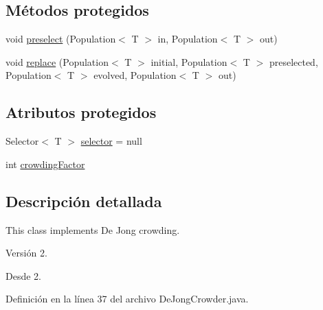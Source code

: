 \subsection*{Métodos protegidos}
\begin{DoxyCompactItemize}
\item 
void \hyperlink{classjenes_1_1stage_1_1operator_1_1common_1_1_de_jong_crowder_3_01_t_01extends_01_chromosome_01_4_a98f463e26bf3fd0fd703320007302594}{preselect} (Population$<$ T $>$ in, Population$<$ T $>$ out)
\item 
void \hyperlink{classjenes_1_1stage_1_1operator_1_1common_1_1_de_jong_crowder_3_01_t_01extends_01_chromosome_01_4_a7d659276ad2103199080458c85acf59e}{replace} (Population$<$ T $>$ initial, Population$<$ T $>$ preselected, Population$<$ T $>$ evolved, Population$<$ T $>$ out)
\end{DoxyCompactItemize}
\subsection*{Atributos protegidos}
\begin{DoxyCompactItemize}
\item 
Selector$<$ T $>$ \hyperlink{classjenes_1_1stage_1_1operator_1_1common_1_1_de_jong_crowder_3_01_t_01extends_01_chromosome_01_4_a6486b0225d345afd81b86dd04772d5ba}{selector} = null
\item 
int \hyperlink{classjenes_1_1stage_1_1operator_1_1common_1_1_de_jong_crowder_3_01_t_01extends_01_chromosome_01_4_ad876594787797e723425c09d74d0a05d}{crowding\-Factor}
\end{DoxyCompactItemize}


\subsection{Descripción detallada}
This class implements De Jong crowding.

\begin{DoxyVersion}{Versión}
2. 
\end{DoxyVersion}
\begin{DoxySince}{Desde}
2. 
\end{DoxySince}


Definición en la línea 37 del archivo De\-Jong\-Crowder.\-java.



